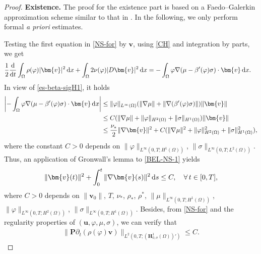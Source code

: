 \documentclass[11pt,reqno]{amsart}
\def\d{{\rm d}}
\def\H{\bm{H}}
\def\uu{\bm{u}}
\def\vv{\bm{v}}
\begin{document}
%
\begin{proof}
\textbf{Existence.} The proof for the existence part is based on a Faedo--Galerkin approximation scheme similar to that in \cite{Gior2021}. In the following, we only perform formal \textit{a priori} estimates.

Testing the first equation in \eqref{NS-for} by $\vv$,  using \eqref{CH} and integration by parts, we get
%
\begin{align}
&\frac12\frac{\d}{\d t} \int_\Omega  \rho (\varphi)|\vv|^2\,\d x
+\int_\Omega  2\nu(\varphi) |D\bm{v}|^2\,\d x
=-\int_\Omega \varphi \nabla (\mu -\beta'(\varphi) \sigma)\cdot \vv\, \d x.
\label{BEL-NS-1}
\end{align}
%
In view of \eqref{es-beta-sigH1}, it holds
%
\begin{align}
\left|-\int_\Omega \varphi \nabla (\mu -\beta'(\varphi) \sigma)\cdot \vv\, \d x\right|
& \leq \|\varphi\|_{L^\infty(\Omega)}(\|\nabla \mu\|+ \|\nabla (\beta'(\varphi)\sigma)\|) \|\vv\|
\notag\\
& \leq C(\|\nabla \mu\|+\|\varphi\|_{H^2(\Omega)}+ \|\sigma\|_{H^1(\Omega)})\|\vv\|
\notag \\
&\leq \frac{\nu_*}{2}\|\nabla \vv\|^2
+ C(\|\nabla \mu\|^2+\|\varphi\|_{H^2(\Omega)}^2+ \|\sigma\|_{H^1(\Omega)}^2), \notag
\end{align}
where the constant $C>0$ depends on $\|\varphi\|_{L^\infty(0,T;H^1(\Omega))}$, $\|\sigma\|_{L^\infty(0,T;L^2(\Omega))}$.
%
Thus, an application of Gronwall's lemma to \eqref{BEL-NS-1} yields
%
\begin{align}
\|\vv(t)\|^2+\int_0^t\|\nabla \vv(s)\|^2\,\d s\leq C,
\quad \forall\, t\in [0,T],
\label{NS-low}
\end{align}
%
where $C>0$ depends on $\|\vv_0\|$, $T$, $\nu_*$, $\rho_*$, $\rho^*$, $\|\mu\|_{L^\infty(0,T;H^1(\Omega))}$, $\|\varphi\|_{L^\infty(0,T;H^2(\Omega))}$, $\|\sigma\|_{L^\infty(0,T;H^1(\Omega))}$.
Besides, from \eqref{NS-for} and the regularity properties of $(\uu, \varphi, \mu, \sigma)$, we can verify that
%
\begin{align}
\|\bm{P}\partial_t(\rho(\varphi)\vv)\|_{L^2(0,T;(\H^1_{0,\sigma}(\Omega))')}\leq C.
\label{NS-low2}
\end{align}


\end{proof}
\end{document}
